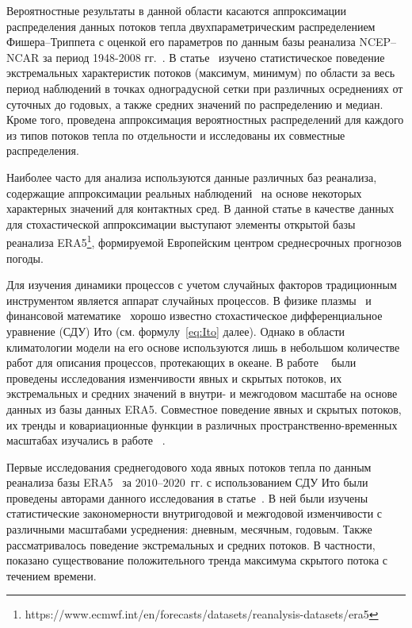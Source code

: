 Вероятностные результаты в данной области касаются аппроксимации распределения данных потоков тепла двухпараметрическим распределением Фишера--Триппета с оценкой его параметров по данным базы реанализа NCEP--NCAR за период 1948-2008 гг.~\cite{gulev2012probability}. В статье~\cite{FAO} изучено статистическое поведение экстремальных характеристик потоков (максимум, минимум) по области за весь период наблюдений в точках одноградусной сетки при различных осреднениях от суточных до годовых, а также средних значений по распределению и медиан. Кроме того, проведена аппроксимация вероятностных распределений для каждого из типов потоков тепла по отдельности и исследованы их совместные распределения.

Наиболее часто для анализа используются данные различных баз реанализа, содержащие аппроксимации реальных наблюдений~\cite{cronin2019air,leyba2019trends} на основе некоторых характерных значений для контактных сред. В данной статье в качестве данных для стохастической аппроксимации выступают элементы открытой базы реанализа ERA5\footnote{https://www.ecmwf.int/en/forecasts/datasets/reanalysis-datasets/era5}, формируемой Европейским центром среднесрочных прогнозов погоды.

Для изучения динамики процессов с учетом случайных факторов традиционным инструментом является аппарат случайных процессов. В физике плазмы~\cite{Espinos2018,Sexty2019} и финансовой математике~\cite{Bouchaud1998} хорошо известно стохастическое дифференциальное уравнение (СДУ) Ито (см. формулу~\eqref{eq:Ito} далее). Однако в области климатологии модели на его основе используются лишь в небольшом количестве работ для описания процессов, протекающих в океане. В работе ~\cite{van2021characterisation} были проведены исследования изменчивости явных и скрытых потоков, их экстремальных и средних значений в внутри- и межгодовом масштабе на основе данных из базы данных ERA5. Совместное поведение явных и скрытых потоков, их тренды и ковариационные функции в различных пространственно-временных масштабах изучались в работе ~\cite{toppaladoddi2021stochastic}. 

Первые исследования среднегодового хода явных потоков тепла по данным реанализа базы ERA5~\cite{hersbach2020era5} за $2010$--$2020$~гг. с использованием СДУ Ито были проведены авторами данного исследования в статье~\cite{2021_SOME_FEATURES}. В ней были изучены статистические закономерности внутригодовой и межгодовой изменчивости с различными масштабами усреднения: дневным, месячным, годовым. Также рассматривалось поведение экстремальных и средних потоков. В частности, показано существование положительного тренда максимума скрытого потока с течением времени. 

